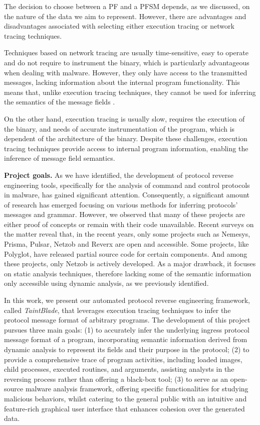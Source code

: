\documentclass[conference]{IEEEtran}
\begin{document}
The decision to choose between a PF and a PFSM depends, as we discussed, on the
nature of the data we aim to represent. However, there are advantages and
disadvantages associated with selecting either execution tracing or network
tracing techniques.

Techniques based on network tracing are usually time-sensitive, easy to operate
and do not require to instrument the binary, which is particularly advantageous
when dealing with malware. However, they only have access to the transmitted
messages, lacking information about the internal program functionality. This
means that, unlike execution tracing techniques, they cannot be used for
inferring the semantics of the message fields \cite{apre_survey}.

On the other hand, execution tracing is usually slow, requires the execution of
the binary, and needs of accurate instrumentation of the program, which is
dependent of the architecture of the binary. Despite these challenges,
execution tracing techniques provide access to internal program information,
enabling the inference of message field semantics.

\textbf{Project goals.}
As we have identified, the development of
protocol reverse engineering tools, specifically for the analysis of command and control protocols in malware, has gained significant attention.
Consequently, a significant amount of research has emerged focusing on various methods for inferring protocols' messages and grammar.
However, we observed that many of these projects are either proof of concepts
or remain with their code unavailable. Recent
surveys on the matter\cite{apre_survey}\cite{apre_survey2} reveal that, in the recent years, only some projects such as Nemesys\cite{github_pre_nemesys}, Prisma\cite{github_pre_prisam}, Pulsar\cite{github_pre_pulsar},
Netzob\cite{github_pre_netzob} and Reverx\cite{github_pre_reverx} are open and accessible.
Some projects, like Polyglot\cite{polyglot_caballero}, have released partial source code for certain components.
And among these projects, only Netzob is actively developed. As a major drawback, it focuses on static analysis techniques, therefore lacking some of the semantic information
only accessible using dynamic analysis, as we previously identified.

In this work, we present our automated protocol reverse engineering framework,
called \textit{TaintBlade}, that leverages execution tracing techniques to
infer the protocol message format of arbitrary programs. The development of
this project pursues three main goals: (1) to accurately infer the underlying
ingress protocol message format of a program, incorporating semantic
information derived from dynamic analysis to represent its fields and their
purpose in the protocol; (2) to provide a comprehensive trace of program
activities, including loaded images, child processes, executed routines, and
arguments, assisting analysts in the reversing process rather than offering a
black-box tool; (3) to serve as an open-source malware analysis framework,
offering specific functionalities for studying malicious behaviors, whilst
catering to the general public with an intuitive and feature-rich graphical
user interface that enhances cohesion over the generated data.
\end{document}
